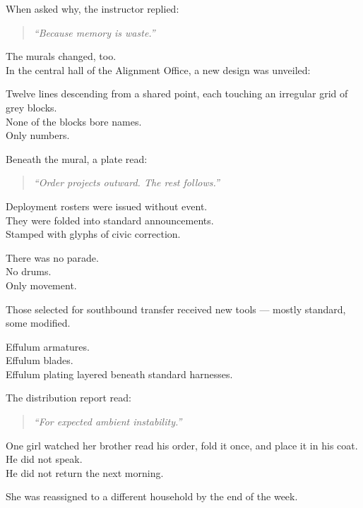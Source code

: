 \documentclass[9pt]{article}
\begin{document}
When asked why, the instructor replied:

\begin{quote}
\textit{“Because memory is waste.”}
\end{quote}

\vspace{1em}

The murals changed, too.\\
In the central hall of the Alignment Office, a new design was unveiled:

Twelve lines descending from a shared point, each touching an irregular grid of grey blocks.\\
None of the blocks bore names.\\
Only numbers.

Beneath the mural, a plate read:

\begin{quote}
\textit{“Order projects outward. The rest follows.”}
\end{quote}

\vspace{1em}

Deployment rosters were issued without event.\\
They were folded into standard announcements.\\
Stamped with glyphs of civic correction.

There was no parade.\\
No drums.\\
Only movement.

Those selected for southbound transfer received new tools — mostly standard, some modified.

Effulum armatures.\\
Effulum blades.\\
Effulum plating layered beneath standard harnesses.

The distribution report read:

\begin{quote}
\textit{“For expected ambient instability.”}
\end{quote}

\vspace{1em}

One girl watched her brother read his order, fold it once, and place it in his coat.\\
He did not speak.\\
He did not return the next morning.

She was reassigned to a different household by the end of the week.
\end{document}

